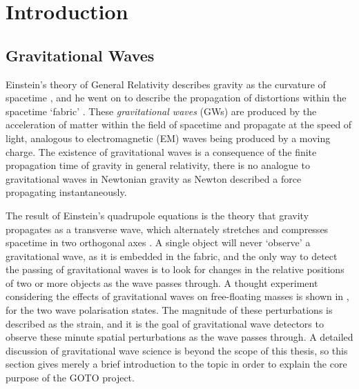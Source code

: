 \chapter{Introduction}
\label{chap:intro}
\chaptoc{}


\newpage
\section{Gravitational Waves}
\label{sec:gw}
\begin{colsection}


\begin{colsection}

Einstein's theory of General Relativity describes gravity as the curvature of spacetime \citep{Einstein1914}, and he went on to describe the propagation of distortions within the spacetime `fabric' \citep{Einstein1916}. These \emph{gravitational waves} (GWs)  are produced by the acceleration of matter within the field of spacetime and propagate at the speed of light, analogous to electromagnetic (EM)  waves being produced by a moving charge. The existence of gravitational waves is a consequence of the finite propagation time of gravity in general relativity, there is no analogue to gravitational waves in Newtonian gravity as Newton described a force propagating instantaneously.

The result of Einstein's quadrupole equations is the theory that gravity propagates as a transverse wave, which alternately stretches and compresses spacetime in two orthogonal axes \citep{BIGcardiff}. A single object will never `observe' a gravitational wave, as it is embedded in the fabric, and the only way to detect the passing of gravitational waves is to look for changes in the relative positions of two or more objects as the wave passes through. A thought experiment considering the effects of gravitational waves on free-floating masses is shown in , for the two wave polarisation states. The magnitude of these perturbations is described as the strain, and it is the goal of gravitational wave detectors to observe these minute spatial perturbations as the wave passes through. A detailed discussion of gravitational wave science is beyond the scope of this thesis, so this section gives merely a brief introduction to the topic in order to explain the core purpose of the GOTO project.


\end{colsection}
\end{colsection}

